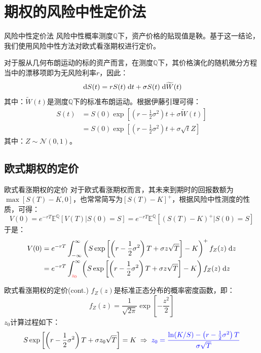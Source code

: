 \documentclass[t]{beamer}
\newcommand{\dif}{{\;\rm d}}
\newcommand{\EQ}{\mathbb{E}^{\mathbb{Q}}}
\begin{document}
\section{期权的风险中性定价法}
\begin{frame}{风险中性定价法}
风险中性概率测度$\mathbb{Q}$下，资产价格的贴现值是鞅。基于这一结论，我们使用风险中性方法对欧式看涨期权进行定价。

对于服从几何布朗运动的标的资产而言，在测度$\mathbb{Q}$下，其价格演化的随机微分方程当中的漂移项即为无风险利率$r$，因此：
\begin{equation*}
\dif S(t)=rS(t)\dif t+\sigma S(t)\dif \widetilde{W}(t)
\end{equation*}
其中：$\widetilde{W}(t)$是测度$\mathbb{Q}$下的标准布朗运动。根据伊藤引理可得：
\begin{equation*}
\begin{split}
S(t)&=S(0)\exp\left[\left( r-\frac{1}{2}\sigma^2\right)  t+\sigma \widetilde{W}(t)\right] \\
&=S(0)\exp\left[\left( r-\frac{1}{2}\sigma^2\right)  t+\sigma \sqrt{t}Z\right]
\end{split}
\end{equation*}
其中：$Z\sim \mathcal{N}(0,1)$。
\end{frame}

\subsection{欧式期权的定价}
\begin{frame}{欧式看涨期权的定价}
	对于欧式看涨期权而言，其未来到期时的回报数额为$\max[S(T)-K,0]$，也常常简写为$[S(T)-K]^+$，根据风险中性测度的性质，可得：
\begin{equation*}
V(0)=e^{-rT}\EQ[V(T)|S(0)=S]=e^{-rT}\EQ\left[(S(T)-K)^+\Big|S(0)=S\right]
\end{equation*}
于是：
\[\begin{split}
V(0)&=e^{-rT} \int^{\infty}_{-\infty} \left( S\exp\left[\left( r-\frac{1}{2}\sigma^2\right)  T+\sigma z \sqrt{T}\right]-K\right) ^+ f_Z(z)\dif z\\
&=e^{-rT} \int^{\infty}_{\color{red}z_0} \left( S\exp\left[\left( r-\frac{1}{2}\sigma^2\right)  T+\sigma z \sqrt{T}\right]-K\right) f_Z(z)\dif z\\
\end{split} \]
\end{frame}

\begin{frame}{欧式看涨期权的定价(cont.)}
$f_Z(z)$是标准正态分布的概率密度函数，即：
\[f_Z(z)=\frac{1}{\sqrt{2\pi}}\exp\left[-\frac{z^2}{2}\right] \]
$z_0$计算过程如下：
\[S\exp\left[\left( r-\frac{1}{2}\sigma^2\right)  T+\sigma z_0 \sqrt{T}\right]=K\;\Rightarrow \;
{\color{blue}z_0=\frac{\ln (K/S)-\left( r-\frac{1}{2}\sigma^2\right)  T}{\sigma\sqrt{T}}}
\]
\end{frame}
\end{document}
